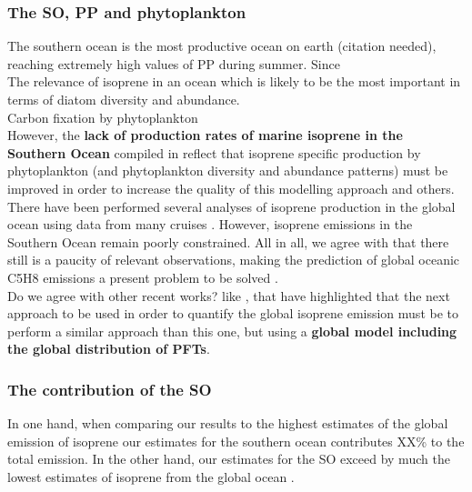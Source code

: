 \documentclass[draft,linenumbers]{agujournal}
\begin{document}
\subsubsection{The SO, PP and phytoplankton}

The southern ocean is the most productive ocean on earth (citation needed), reaching extremely high values of PP during summer. Since\\

The relevance of isoprene in an ocean which is likely to be the most important in terms of diatom diversity and abundance.\\

Carbon fixation by phytoplankton\\

However, the \textbf{lack of production rates of marine isoprene in the Southern Ocean} compiled in \citep{booge2016can} reflect that isoprene specific production by phytoplankton (and phytoplankton diversity and abundance patterns) must be improved in order to increase the quality of this modelling approach and others. There have been performed several analyses of isoprene production in the global ocean using data from many cruises \citep{hackenberg2017potential}. However, isoprene emissions in the Southern Ocean remain poorly constrained. All in all, we agree with \citep{ooki2015global} that there still is a paucity of relevant observations, making the prediction of global oceanic C5H8 emissions a present problem to be solved \citep{ooki2015global}.\\

Do we agree with other recent works? like \citep{hackenberg2017potential}, that have highlighted that the next approach to be used in order to quantify the global isoprene emission must be to perform a similar approach than this one, but using a \textbf{global model including the global distribution of PFTs}.\\

\subsubsection{The contribution of the SO}

In one hand, when comparing our results to the highest estimates of the global emission of isoprene \citep{luo2010numerical} our estimates for the southern ocean contributes XX\% to the total emission.  In the other hand, our estimates for the SO exceed by much the lowest estimates of isoprene from the global ocean \citep{Arnold2009,booge2016can,palmer2005quantifying,gantt2009new}.
\end{document}

